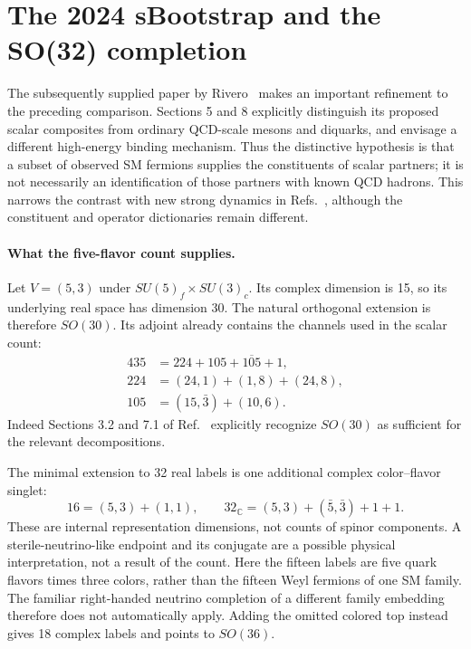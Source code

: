 \section{The 2024 sBootstrap and the SO(32) completion}
\label{sec:so32completion}
The subsequently supplied paper by Rivero~\cite{Rivero2024} makes an
important refinement to the preceding comparison. Sections 5 and 8
explicitly distinguish its proposed scalar composites from ordinary
QCD-scale mesons and diquarks, and envisage a different high-energy
binding mechanism. Thus the distinctive hypothesis is that a subset
of observed SM fermions supplies the constituents of scalar partners;
it is not necessarily an identification of those partners with known
QCD hadrons. This narrows the contrast with new strong dynamics in
Refs.~\cite{ARS2025,AGRS2026}, although the constituent and operator
dictionaries remain different.

\paragraph{What the five-flavor count supplies.}
Let $V=(5,3)$ under $SU(5)_f\times SU(3)_c$.
Its complex dimension is 15, so its underlying real space has dimension
30. The natural orthogonal extension is therefore $SO(30)$.
Its adjoint already contains the channels used in the scalar count:
\begin{align}
435&=224+105+\overline{105}+1,\\
224&=(24,1)+(1,8)+(24,8),\\
105&=(15,\bar3)+(10,6).
\end{align}
Indeed Sections 3.2 and 7.1 of Ref.~\cite{Rivero2024} explicitly
recognize $SO(30)$ as sufficient for the relevant decompositions.

The minimal extension to 32 real labels is one additional complex
color--flavor singlet:
\begin{equation}
16=(5,3)+(1,1),\qquad
32_{\mathbb C}=(5,3)+(\bar5,\bar3)+1+1.
\end{equation}
These are internal representation dimensions, not counts of spinor
components. A sterile-neutrino-like endpoint and its conjugate are a
possible physical interpretation, not a result of the count. Here the
fifteen labels are five quark flavors times three colors, rather than
the fifteen Weyl fermions of one SM family. The familiar right-handed
neutrino completion of a different family embedding therefore does
not automatically apply. Adding the omitted colored top instead
gives 18 complex labels and points to $SO(36)$.

